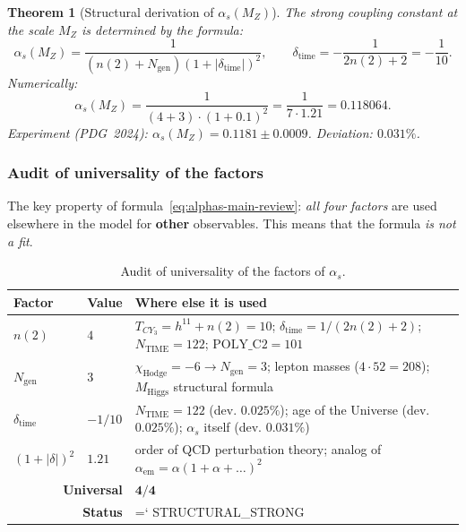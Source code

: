 \documentclass[11pt,a4paper]{article}
\newcommand{\CY}{CY_3}
\newcommand{\Ngen}{N_{\text{gen}}}
\renewcommand{\texttt}[1]{{\ttfamily\hyphenchar\font=`\- #1}}
\newtheorem{theorem}{Theorem}[section]
\theoremstyle{definition}
\begin{document}
\begin{theorem}[Structural derivation of $\alpha_s(M_Z)$]
\label{thm:alphas-structural-review}
The strong coupling constant at the scale $M_Z$ is determined 
by the formula:
\begin{equation}
    \boxed{
    \alpha_s(M_Z) = \frac{1}{(n(2) + \Ngen)(1 + |\delta_{\text{time}}|)^2},
    \qquad
    \delta_{\text{time}} = -\frac{1}{2n(2) + 2} = -\frac{1}{10}.
    }
    \label{eq:alphas-main-review}
\end{equation}
Numerically:
\begin{equation}
    \alpha_s(M_Z) = \frac{1}{(4 + 3) \cdot (1 + 0.1)^2}
    = \frac{1}{7 \cdot 1.21} = 0.118064.
\end{equation}
Experiment (PDG~2024): $\alpha_s(M_Z) = 0.1181 \pm 0.0009$.
Deviation: $\mathbf{0.031\%}$.
\end{theorem}

\subsubsection{Audit of universality of the factors}

The key property of formula~\eqref{eq:alphas-main-review}: 
\emph{all four factors} are used elsewhere in the model for 
\textbf{other} observables. This means that 
the formula \emph{is not a fit}.

\begin{table}[htbp]
\centering
\caption{Audit of universality of the factors of $\alpha_s$.}
\label{tab:alphas-audit-review}
\begin{tabular}{p{2.5cm}p{1.5cm}p{8cm}}
\toprule
Factor & Value & Where else it is used \\
\midrule
$n(2)$ & $4$ & 
    $T_{\CY} = h^{11} + n(2) = 10$;
    $\delta_{\text{time}} = 1/(2n(2)+2)$;
    $N_{\text{TIME}} = 122$;
    $\text{POLY\_C2} = 101$ \\[0.3em]
$\Ngen$ & $3$ & 
    $\chi_{\text{Hodge}} = -6 \to \Ngen = 3$;
    lepton masses ($4 \cdot 52 = 208$);
    $M_{\text{Higgs}}$ structural formula \\[0.3em]
$\delta_{\text{time}}$ & $-1/10$ & 
    $N_{\text{TIME}} = 122$ (dev. $0.025\%$);
    age of the Universe (dev. $0.025\%$);
    $\alpha_s$ itself (dev. $0.031\%$) \\[0.3em]
$(1+|\delta|)^2$ & $1.21$ & 
    order of QCD perturbation theory;
    analog of $\alpha_{\text{em}} = \alpha(1 + \alpha + \ldots)^2$ \\
\midrule
\multicolumn{2}{r}{\textbf{Universal}} & $\mathbf{4/4}$ \\[0.2em]
\multicolumn{2}{r}{\textbf{Status}} & \texttt{STRUCTURAL\_STRONG} \\
\bottomrule
\end{tabular}
\end{table}
\end{document}

